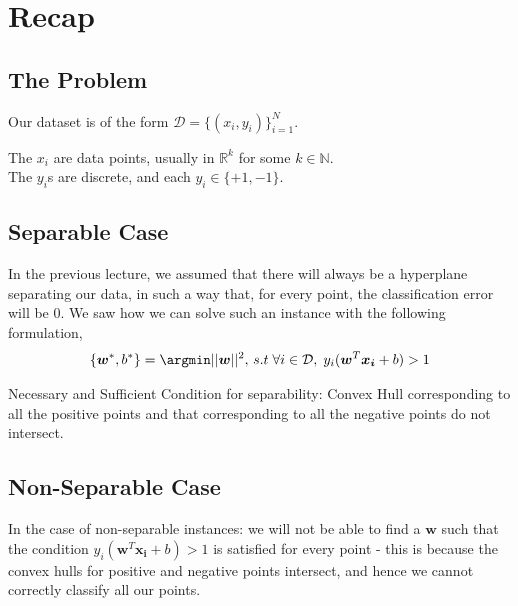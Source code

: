 \documentclass[12pt]{article}
\begin{document}
	\MakeScribeTop


\section{Recap}

    \subsection{The Problem}
    
     Our dataset is of the form $\mathcal{D}=\{(x_i,y_i)\}_{i=1}^N$. 
     
     The $x_i$ are data points, usually in $\mathbb{R}^k$ for some $k \in \mathbb{N}$. \\
     The $y_i$s are discrete, and each $ y_i \in \{+1,-1\}$. 
     
    \subsection{Separable Case}
    
    In the previous lecture, we assumed that there will always be a hyperplane separating our data, in such a way that, for every point, the classification error will be 0. We saw how we can solve such an instance with the following formulation,
    \begin{gather*}
        \{\boldsymbol{w}^*, b^*\} = \argmin ||\boldsymbol{w}||^2,\, s.t \; \forall i \in \mathcal{D}, \; y_i(\boldsymbol{w}^T\boldsymbol{x_i}+b) > 1
    \end{gather*}
    
    Necessary and Sufficient Condition for separability: Convex Hull corresponding to all the positive points and that corresponding to all the negative points do not intersect. 
    
  
    \subsection{Non-Separable Case}
    
    In the case of non-separable instances: we will not be able to find a $\boldsymbol{w}$ such that the condition $ y_i(\boldsymbol{w}^T\boldsymbol{x_i}+b) > 1$ is satisfied for every point - this is because the convex hulls for positive and negative points intersect, and hence we cannot correctly classify all our points.
\end{document}
